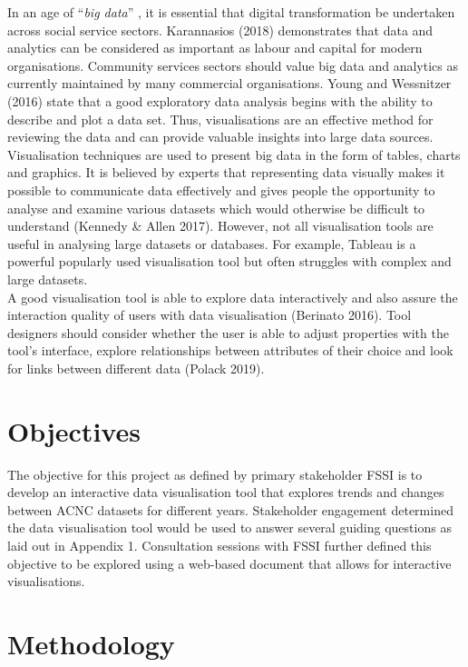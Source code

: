 \documentclass[
  11pt,
]{article}
\begin{document}
In an age of ``\emph{big data}'' , it is essential that digital transformation be undertaken across social service sectors. Karannasios (2018) demonstrates that data and analytics can be considered as important as labour and capital for modern organisations. Community services sectors should value big data and analytics as currently maintained by many commercial organisations. Young and Wessnitzer (2016) state that a good exploratory data analysis begins with the ability to describe and plot a data set. Thus, visualisations are an effective method for reviewing the data and can provide valuable insights into large data sources.\\
Visualisation techniques are used to present big data in the form of tables, charts and graphics. It is believed by experts that representing data visually makes it possible to communicate data effectively and gives people the opportunity to analyse and examine various datasets which would otherwise be difficult to understand (Kennedy \& Allen 2017). However, not all visualisation tools are useful in analysing large datasets or databases. For example, Tableau is a powerful popularly used visualisation tool but often struggles with complex and large datasets.\\
A good visualisation tool is able to explore data interactively and also assure the interaction quality of users with data visualisation (Berinato 2016). Tool designers should consider whether the user is able to adjust properties with the tool's interface, explore relationships between attributes of their choice and look for links between different data (Polack 2019).

\newpage

\hypertarget{objectives}{%
\section{Objectives}\label{objectives}}

The objective for this project as defined by primary stakeholder FSSI is to develop an interactive data visualisation tool that explores trends and changes between ACNC datasets for different years.
Stakeholder engagement determined the data visualisation tool would be used to answer several guiding questions as laid out in Appendix 1. Consultation sessions with FSSI further defined this objective to be explored using a web-based document that allows for interactive visualisations.

\hypertarget{methodology}{%
\section{Methodology}\label{methodology}}
\end{document}
